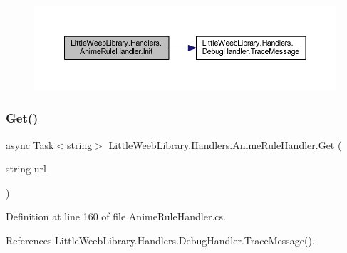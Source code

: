 \begin{figure}[H]
\begin{center}
\leavevmode
\includegraphics[width=350pt]{class_little_weeb_library_1_1_handlers_1_1_anime_rule_handler_a719277ca087cc0e4b46708179d62b07f_cgraph}
\end{center}
\end{figure}
\mbox{\label{class_little_weeb_library_1_1_handlers_1_1_anime_rule_handler_a721f5c5ac798ca7e81286b3f401921fb}} 
\subsubsection{\texorpdfstring{Get()}{Get()}}
{\footnotesize\ttfamily async Task$<$string$>$ Little\+Weeb\+Library.\+Handlers.\+Anime\+Rule\+Handler.\+Get (\begin{DoxyParamCaption}\item[{string}]{url }\end{DoxyParamCaption})\hspace{0.3cm}{\ttfamily [private]}}



Definition at line 160 of file Anime\+Rule\+Handler.\+cs.



References Little\+Weeb\+Library.\+Handlers.\+Debug\+Handler.\+Trace\+Message().


